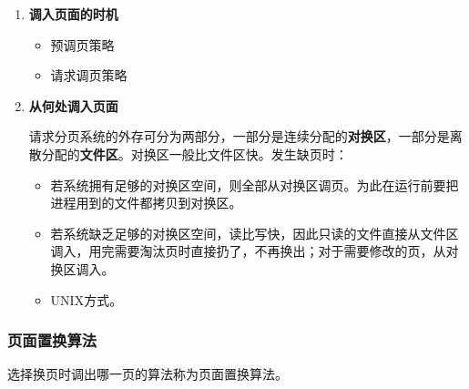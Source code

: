 \documentclass[12pt, a4paper, oneside]{ctexart}
\begin{document}
\begin{enumerate}
  \item {\bf 调入页面的时机}
  
  \begin{itemize}
    \item 预调页策略
    \item 请求调页策略
  \end{itemize}

  \item {\bf 从何处调入页面}
  
  请求分页系统的外存可分为两部分，一部分是连续分配的\textbf{对换区}，一部分是离散分配的\textbf{文件区}。对换区一般比文件区快。发生缺页时：
  \begin{itemize}
    \item 若系统拥有足够的对换区空间，则全部从对换区调页。为此在运行前要把进程用到的文件都拷贝到对换区。
    \item 若系统缺乏足够的对换区空间，读比写快，因此只读的文件直接从文件区调入，用完需要淘汰页时直接扔了，不再换出；对于需要修改的页，从对换区调入。
    \item UNIX方式。
  \end{itemize}
\end{enumerate}

\subsubsection{页面置换算法}

选择换页时调出哪一页的算法称为页面置换算法。
\end{document}
